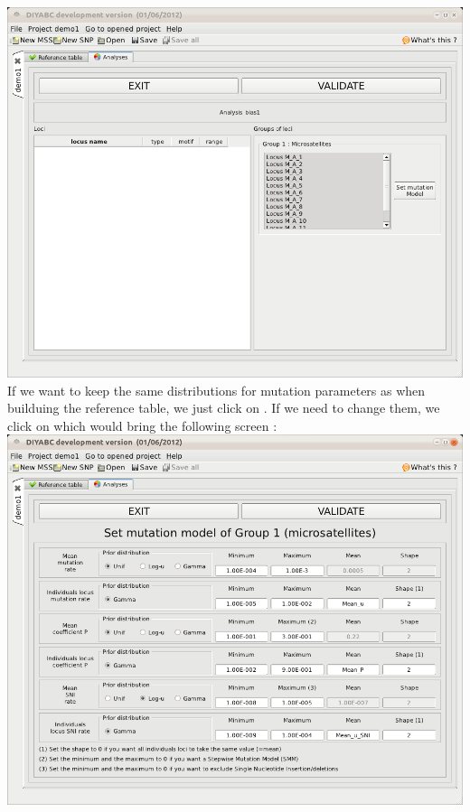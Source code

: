 \includegraphics[scale=0.35]{gui_pictures/Capture-DIYABC-47} \\


If we want to keep the same distributions for mutation parameters
as when builduing the reference table, we just click on .
If we need to change them, we click on  which would bring the following screen :\\


\includegraphics[scale=0.35]{gui_pictures/Capture-DIYABC-48} \\


